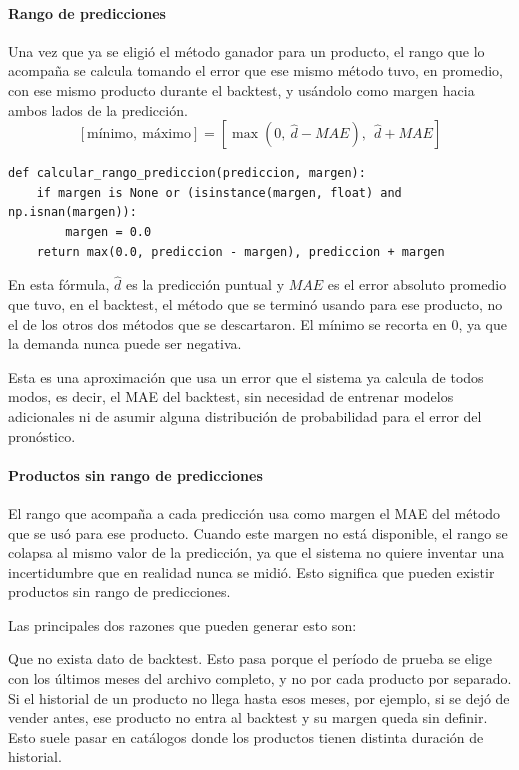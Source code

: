 \paragraph{Rango de predicciones}

Una vez que ya se eligió el método ganador para un producto, el rango que lo acompaña se calcula tomando el error que ese mismo método tuvo, en promedio, con ese mismo producto durante el backtest, y usándolo como margen hacia ambos lados de la predicción.
\[
[\text{mínimo},\ \text{máximo}] = \left[\max(0,\ \hat{d} - MAE),\ \ \hat{d} + MAE\right]
\]

\label{lst:calcular_rango_prediccion}
\begin{verbatim}
def calcular_rango_prediccion(prediccion, margen):
    if margen is None or (isinstance(margen, float) and np.isnan(margen)):
        margen = 0.0
    return max(0.0, prediccion - margen), prediccion + margen
\end{verbatim}

En esta fórmula, $\hat{d}$ es la predicción puntual y $MAE$ es el error absoluto promedio que tuvo, en el backtest, el método que se terminó usando para ese producto, no el de los otros dos métodos que se descartaron. El mínimo se recorta en 0, ya que la demanda nunca puede ser negativa.

Esta es una aproximación que usa un error que el sistema ya calcula de todos modos, es decir, el MAE del backtest, sin necesidad de entrenar modelos adicionales ni de asumir alguna distribución de probabilidad para el error del pronóstico.

\paragraph{Productos sin rango de predicciones}

El rango que acompaña a cada predicción usa como margen el MAE del método que se usó para ese producto. Cuando este margen no está disponible, el rango se colapsa al mismo valor de la predicción, ya que el sistema no quiere inventar una incertidumbre que en realidad nunca se midió. Esto significa que pueden existir productos sin rango de predicciones.

Las principales dos razones que pueden generar esto son:

Que no exista dato de backtest. Esto pasa porque el período de prueba se elige con los últimos meses del archivo completo, y no por cada producto por separado. Si el historial de un producto no llega hasta esos meses, por ejemplo, si se dejó de vender antes, ese producto no entra al backtest y su margen queda sin definir. Esto suele pasar en catálogos donde los productos tienen distinta duración de historial.


